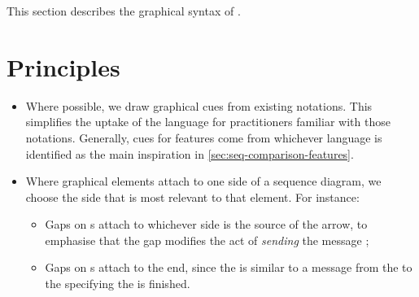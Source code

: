 
This section describes the graphical syntax of \langname.


\section{Principles}


\begin{itemize}
\item Where possible, we draw graphical cues from existing notations.
  This simplifies the uptake of the language for practitioners
  familiar with those notations.  Generally, cues for features come
  from whichever language is identified as the main inspiration in
  \cref{sec:seq-comparison-features}.
\item Where graphical elements attach to one side of a sequence diagram,
  we choose the side that is most relevant to that element.  For instance:
  \begin{itemize}
  \item Gaps on \marrowaction s attach to whichever
    side is the source of the arrow, to emphasise that the gap modifies
    the act of \emph{sending} the message ;
  \item Gaps on \mfinalaction s attach to the \mtarget{} end,
    since the \mfinalaction{} is similar to a message from the \mtarget{} to
    the \mworld{} specifying the \mtarget{} is finished.
  \end{itemize}
\end{itemize}

